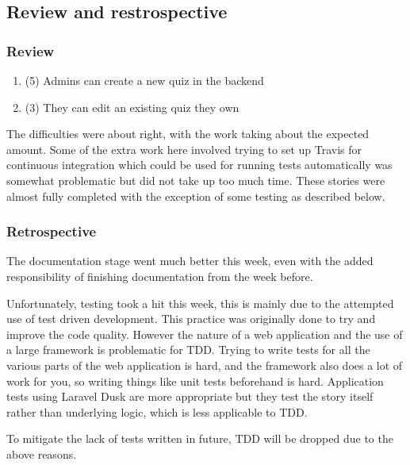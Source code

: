 \subsection{Review and restrospective}
\subsubsection{Review}
\begin{enumerate}
	\item (5) Admins can create a new quiz in the backend
	\item (3) They can edit an existing quiz they own
\end{enumerate}
The difficulties were about right, with the work taking about the expected amount. Some of the extra work here involved trying to set up Travis for continuous integration which could be used for running tests automatically was somewhat problematic but did not take up too much time. These stories were almost fully completed with the exception of some testing as described below.

\subsubsection{Retrospective}
The documentation stage went much better this week, even with the added responsibility of finishing documentation from the week before.

Unfortunately, testing took a hit this week, this is mainly due to the attempted use of test driven development. This practice was originally done to try and improve the code quality. However the nature of a web application and the use of a large framework is problematic for TDD. Trying to write tests for all the various parts of the web application is hard, and the framework also does a lot of work for you, so writing things like unit tests beforehand is hard. Application tests using Laravel Dusk are more appropriate but they test the story itself rather than underlying logic, which is less applicable to TDD. 

To mitigate the lack of tests written in future, TDD will be dropped due to the above reasons.
\newpage
